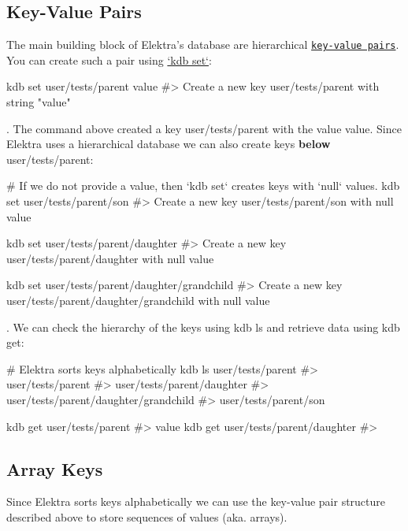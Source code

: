 \subsection*{Key-\/\+Value Pairs}

The main building block of Elektra’s database are hierarchical \href{https://en.wikipedia.org/wiki/Key-value_database}{\tt key-\/value pairs}. You can create such a pair using \hyperlink{doc_help_kdb-set_md}{`kdb set`}\+:


\begin{DoxyCode}
kdb set user/tests/parent value
#> Create a new key user/tests/parent with string "value"
\end{DoxyCode}


. The command above created a key {\ttfamily user/tests/parent} with the value {\ttfamily value}. Since Elektra uses a hierarchical database we can also create keys {\bfseries below} {\ttfamily user/tests/parent}\+:


\begin{DoxyCode}
# If we do not provide a value, then `kdb set` creates keys with `null` values.
kdb set user/tests/parent/son
#> Create a new key user/tests/parent/son with null value

kdb set user/tests/parent/daughter
#> Create a new key user/tests/parent/daughter with null value

kdb set user/tests/parent/daughter/grandchild
#> Create a new key user/tests/parent/daughter/grandchild with null value
\end{DoxyCode}


. We can check the hierarchy of the keys using {\ttfamily kdb ls} and retrieve data using {\ttfamily kdb get}\+:


\begin{DoxyCode}
# Elektra sorts keys alphabetically
kdb ls user/tests/parent
#> user/tests/parent
#> user/tests/parent/daughter
#> user/tests/parent/daughter/grandchild
#> user/tests/parent/son

kdb get user/tests/parent
#> value
kdb get user/tests/parent/daughter
#>
\end{DoxyCode}


\subsection*{Array Keys}

Since Elektra sorts keys alphabetically we can use the key-\/value pair structure described above to store sequences of values (aka. arrays).

